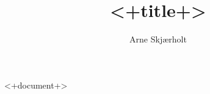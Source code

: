 \documentclass[11pt]{article}
\title{<+title+>}
\author{Arne Skj{\ae}rholt}
\begin{document}
\maketitle

<+document+>
\end{document}
